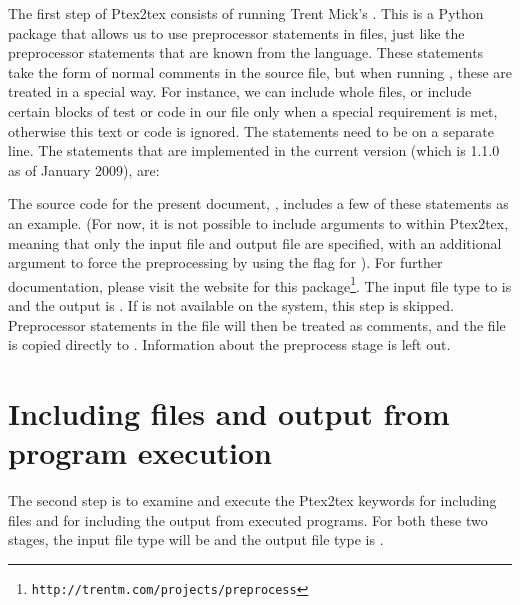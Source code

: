 \documentclass[a4paper,11pt]{article}
\begin{document}
The first step of Ptex2tex consists of running Trent Mick's . This is a Python
package that allows us to use preprocessor statements in files, just like the
preprocessor statements that are known from the  language. These
statements take the form of normal comments in the source file, but when
running , these are treated in a special way. For
instance, we can include whole files, or include certain blocks of
test or code in our file only when a special requirement is met, otherwise this text
or code is ignored. The statements need to be on a
separate line. The statements that are implemented in the current version
(which is 1.1.0 as of January 2009), are:
\begin{itemize}
\item
\code{%
\item
\code{%
\item
\code{%
\item
\code{%
\item
\code{%
\item
\code{%
\item
\code{%
\item
\code{%
\item
\code{%
\item
\code{%
\end{itemize}
The source code for the present document, , includes a few of these
statements as an example. (For now, it is not possible to include arguments to
 within Ptex2tex, meaning that only the input file and output
file are specified, with an additional argument to force the preprocessing
 by using the  flag for ). For further documentation, please
visit the website for this
package\footnote{\texttt{http://trentm.com/projects/preprocess}}. The input file
type to  is  and the output is .  If
 is not available on the system, this step is skipped. Preprocessor
statements in the file will then be treated as comments, and the file is
copied directly to .
Information about the preprocess stage is left out.

\section{Including files and output from program execution}
The second step is to examine and execute the Ptex2tex keywords for
including files and for including the output from executed programs. For both
these two stages, the input file type will be  and the output file
type is .
\end{document}
